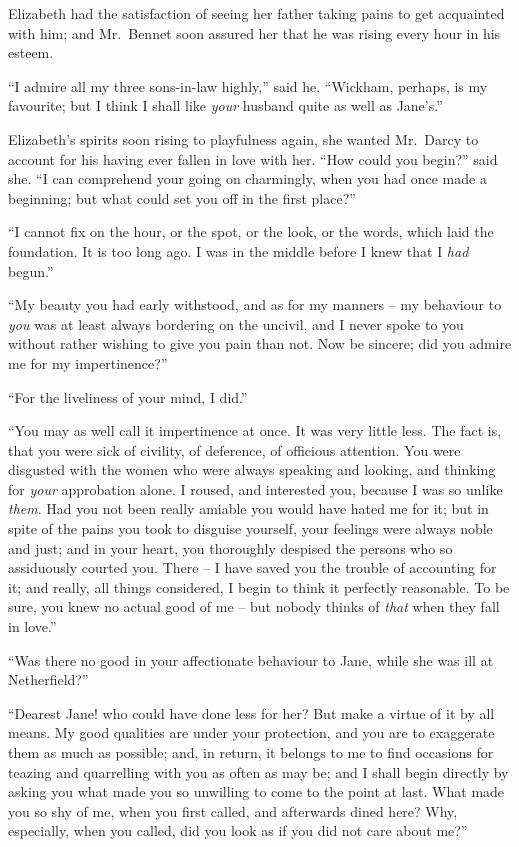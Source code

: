 Elizabeth had the satisfaction of seeing her father
taking pains to get acquainted with him; and Mr.\ Bennet
soon assured her that he was rising every hour in his
esteem.

“I admire all my three sons-in-law highly,” said he.
“Wickham, perhaps, is my favourite; but I think I shall
like \textit{your} husband quite as well as Jane’s.”


Elizabeth’s spirits soon rising to playfulness again, she
want\-ed Mr.\ Darcy to account for his having ever fallen
in love with her. “How could you begin?” said she.
“I can comprehend your going on charmingly, when you
had once made a beginning; but what could set you off
in the first place?”

“I cannot fix on the hour, or the spot, or the look, or
the words, which laid the foundation. It is too long ago.
I was in the middle before I knew that I \textit{had} begun.”

“My beauty you had early withstood, and as for my
manners -- my behaviour to \textit{you} was at least always
bordering on the uncivil, and I never spoke to you without
rather wishing to give you pain than not. Now be
sincere; did you admire me for my impertinence?”

“For the liveliness of your mind, I did.”

“You may as well call it impertinence at once. It was
very little less. The fact is, that you were sick of civility,
of deference, of officious attention. You were disgusted
with the women who were always speaking and looking,
and thinking for \textit{your} approbation alone. I roused, and
interested you, because I was so unlike \textit{them}. Had you
not been really amiable you would have hated me for it;
but in spite of the pains you took to disguise yourself,
your feelings were always noble and just; and in your
heart, you thoroughly despised the persons who so assiduously
courted you. There -- I have saved you the trouble
of accounting for it; and really, all things considered,
I begin to think it perfectly reasonable. To be sure, you
knew no actual good of me -- but nobody thinks of \textit{that}
when they fall in love.”

“Was there no good in your affectionate behaviour to
Jane, while she was ill at Netherfield?”

“Dearest Jane! who could have done less for her?
But make a virtue of it by all means. My good qualities
are under your protection, and you are to exaggerate them
as much as possible; and, in return, it belongs to me to
find occasions for teazing and quarrelling with you as often
as may be; and I shall begin directly by asking you what
made you so unwilling to come to the point at last. What
made you so shy of me, when you first called, and afterwards
dined here? Why, especially, when you called, did
you look as if you did not care about me?”

